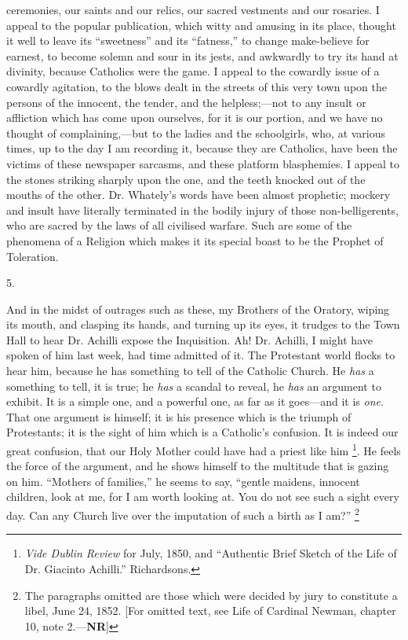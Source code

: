 ceremonies, our saints and our relics, our sacred
vestments and our rosaries. I appeal to the popular
publication, which witty and amusing in its place,
thought it well to leave its ``sweetness'' and
its ``fatness,'' to change make-believe for
earnest, to become solemn and sour in its jests, and
awkwardly to try its hand at divinity, because Catholics
were the game. I appeal to the cowardly issue of a
cowardly agitation, to the blows dealt in the streets of
this very town upon the persons of the innocent, the
tender, and the helpless;—not to any insult or
affliction which has come upon ourselves, for it is our
portion, and we have no thought of complaining,—but
to the ladies and the schoolgirls, who, at various times,
up to the day I am recording it, because they are
Catholics, have been the victims of these newspaper
sarcasms, and these platform blasphemies. I appeal to the
stones striking sharply upon the one, and the teeth
knocked out of the mouths of the other. Dr. Whately's
words have been almost prophetic; mockery and insult have
literally terminated in the bodily injury of those
non-belligerents, who are sacred by the laws of all
civilised warfare. Such are some of the phenomena of a
Religion which makes it its special boast to be the
Prophet of Toleration.

5.

And in the midst of outrages such as these, my
Brothers of the Oratory, wiping its mouth, and clasping
its hands, and turning up its eyes, it trudges to the
Town Hall to hear Dr. Achilli expose the Inquisition. Ah!
Dr. Achilli, I might have spoken of him last week, had
time admitted of it. The Protestant world flocks to hear
him, because he has something to tell of the Catholic
Church. He \emph{has} a something to tell, it is true;
he \emph{has} a scandal to reveal, he \emph{has} an
argument to exhibit. It is a simple one, and a powerful
one, as far as it goes—and it is \emph{one}. That
one argument is himself; it is his presence which is the
triumph of Protestants; it is the sight of him which is a
Catholic's confusion. It is indeed our great confusion,
that our Holy Mother could have had a priest like him \footnote{\emph{Vide Dublin Review} for
July, 1850, and ``Authentic Brief Sketch of the Life
of Dr. Giacinto Achilli.'' Richardsons.}. He feels
the force of the argument, and he shows himself to the
multitude that is gazing on him. ``Mothers of
families,'' he seems to say, ``gentle maidens,
innocent children, look at me, for I am worth looking at.
You do not see such a sight every day. Can any Church
live over the imputation of such a birth as I am?'' \footnote{The paragraphs omitted are
those which were decided by jury to constitute a libel,
June 24, 1852. [For omitted text, see Life of Cardinal Newman, chapter
10, note 2.—\textbf{NR}]}

